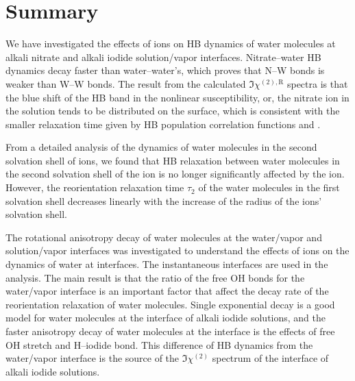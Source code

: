 \section{Summary}
We have investigated the effects of ions on HB dynamics
of water molecules at alkali nitrate and alkali iodide solution/vapor interfaces.
Nitrate--water HB dynamics decay faster than water--water's, 
which proves that N--W bonds is weaker than W--W bonds. 
The result from the calculated $\Im\chi^{(2),\text{R}}$ spectra is that the blue shift of the HB band in the nonlinear susceptibility, 
or, the nitrate ion in the solution tends to be distributed on the surface, 
which is consistent with the smaller relaxation time given by HB population correlation functions \CHB and \SHB.


From a detailed analysis of the dynamics of water molecules in the second solvation shell of ions, 
we found that HB relaxation between water molecules in the second solvation shell of the ion is 
no longer significantly affected by the ion.
However, the reorientation relaxation time $\tau_2$ of the water molecules in the first solvation shell 
decreases linearly with the increase of the radius of the ions' solvation shell. 

The rotational anisotropy decay of water molecules at the water/vapor and solution/vapor interfaces was investigated to
understand the effects of ions on the dynamics of water at interfaces.
The instantaneous interfaces are used in the analysis. The main result is that the ratio of the free OH bonds for the water/vapor interface is an important factor 
that affect the decay rate of the reorientation relaxation of water molecules.
Single exponential decay is a good model for water molecules at the interface of alkali iodide solutions,
and the faster anisotropy decay of water molecules at the interface is the effects of free OH stretch and H--iodide bond.
This difference of HB dynamics from the water/vapor interface is the source of 
the $\Im\chi^{(2)}$ spectrum of the interface of alkali iodide solutions.  
